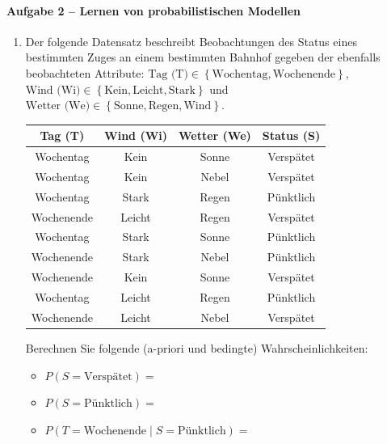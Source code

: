 \documentclass[fleqn]{latex-classes/summary}
\begin{document}
\paragraph{Aufgabe 2 -- Lernen von probabilistischen Modellen}

\begin{enumerate}
  \item Der folgende Datensatz beschreibt Beobachtungen des Status eines bestimmten Zuges an einem bestimmten Bahnhof gegeben der ebenfalls beobachteten Attribute: \( \text{Tag (T)} \in \left \{ \text{Wochentag}, \text{Wochenende} \right \} \), \( \text{Wind (Wi)} \in \left \{ \text{Kein}, \text{Leicht}, \text{Stark} \right \} \) und \( \text{Wetter (We)} \in \left \{ \text{Sonne}, \text{Regen}, \text{Wind} \right \} \).
    
  \begin{center}
    \small
    \begin{tabular}{ | c | c | c | c | }
      \hline
      \textbf{Tag (T)} & \textbf{Wind (Wi)} & \textbf{Wetter (We)} & \textbf{Status (S)} \\\hline
      Wochentag & Kein & Sonne & Verspätet \\\hline
      Wochentag & Kein & Nebel & Verspätet \\\hline
      Wochentag & Stark & Regen & Pünktlich \\\hline
      Wochenende & Leicht & Regen & Verspätet \\\hline
      Wochentag & Stark & Sonne & Pünktlich \\\hline
      Wochenende & Stark & Nebel & Pünktlich \\\hline
      Wochenende & Kein & Sonne & Verspätet \\\hline      
      Wochentag & Leicht & Regen & Pünktlich \\\hline
      Wochenende & Leicht & Nebel & Verspätet \\\hline
    \end{tabular}
  \end{center}

  Berechnen Sie folgende (a-priori und bedingte) Wahrscheinlichkeiten:
  \begin{itemize}
    \item \( P(S = \text{Verspätet}) = \)
    \item \( P(S = \text{Pünktlich}) = \)
    \item \( P(T = \text{Wochenende} \mid S = \text{Pünktlich}) = \)
  \end{itemize}


\end{enumerate}
\end{document}
